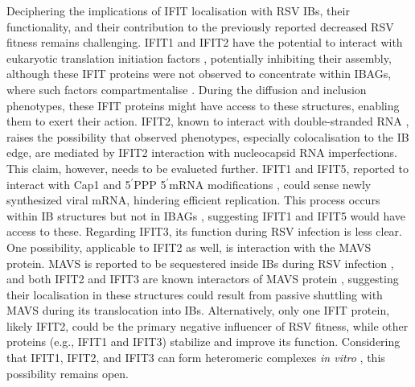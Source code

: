 Deciphering the implications of IFIT localisation with RSV IBs, their functionality, and their contribution to the previously reported decreased RSV fitness remains challenging. IFIT1 and IFIT2 have the potential to interact with eukaryotic translation initiation factors \cite{Diamond2014IFIT1:Translation, Guo2000CharacterizationVirus}, potentially inhibiting their assembly, although these IFIT proteins were not observed to concentrate within IBAGs, where such factors compartmentalise \cite{Jobe2023ViralCondensates}. During the diffusion and inclusion phenotypes, these IFIT proteins might have access to these structures, enabling them to exert their action. IFIT2, known to interact with double-stranded RNA \cite{Yang2012CrystalMechanisms}, raises the possibility that observed phenotypes, especially colocalisation to the IB edge, are mediated by IFIT2 interaction with nucleocapsid RNA imperfections. This claim, however, needs to be evalueted further. IFIT1 and IFIT5, reported to interact with Cap1 and 5$^{\prime}$PPP 5$^{\prime}$mRNA modifications \cite{Kumar2014InhibitionMRNAs}, could sense newly synthesized viral mRNA, hindering efficient replication. This process occurs within IB structures but not in IBAGs \cite{Rincheval2017FunctionalVirus}, suggesting IFIT1 and IFIT5 would have access to these. Regarding IFIT3, its function during RSV infection is less clear. One possibility, applicable to IFIT2 as well, is interaction with the MAVS protein. MAVS is reported to be sequestered inside IBs during RSV infection \cite{Lifland2012HumanMAVS}, and both IFIT2 and IFIT3 are known interactors of MAVS protein \cite{Chen2017InhibitionApoptosis, Diamond2013TheProteins, Liu2011IFN-InducedTBK1}, suggesting their localisation in these structures could result from passive shuttling with MAVS during its translocation into IBs. Alternatively, only one IFIT protein, likely IFIT2, could be the primary negative influencer of RSV fitness, while other proteins (e.g., IFIT1 and IFIT3) stabilize and improve its function. Considering that IFIT1, IFIT2, and IFIT3 can form heteromeric complexes \textit{in vitro} \cite{Mears2018BetterResponse}, this possibility remains open.

